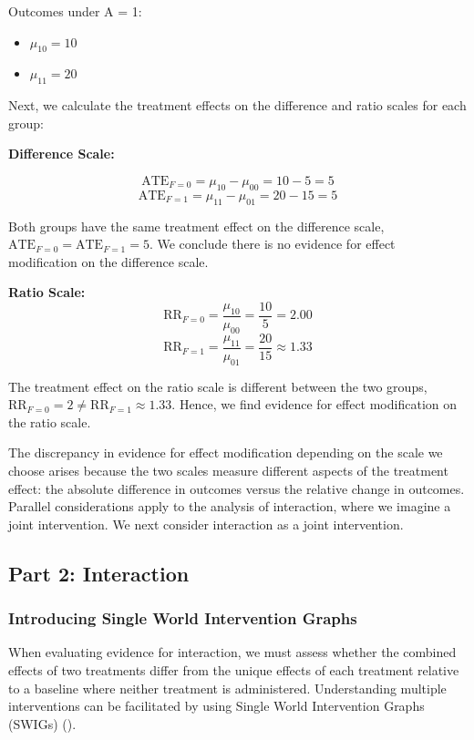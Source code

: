 \documentclass[
  single column]{article}
\providecommand{\tightlist}{%
  \setlength{\itemsep}{0pt}\setlength{\parskip}{0pt}}\usepackage{longtable,booktabs,array}
\begin{document}
Outcomes under A = 1:

\begin{itemize}
\tightlist
\item
  \(\mu_{10} = 10\)
\item
  \(\mu_{11} = 20\)
\end{itemize}

Next, we calculate the treatment effects on the difference and ratio
scales for each group:

\textbf{Difference Scale:}

\[
\text{ATE}_{F = 0} = \mu_{10} - \mu_{00} = 10 - 5 = 5
\] \[
\text{ATE}_{F = 1} = \mu_{11} - \mu_{01} = 20 - 15 = 5
\]

Both groups have the same treatment effect on the difference scale,
\(\text{ATE}_{F = 0} = \text{ATE}_{F = 1} = 5\). We conclude there is no
evidence for effect modification on the difference scale.

\textbf{Ratio Scale:} \[
\text{RR}_{F = 0} = \frac{\mu_{10}}{\mu_{00}} = \frac{10}{5} = 2.00
\] \[
\text{RR}_{F = 1} = \frac{\mu_{11}}{\mu_{01}} = \frac{20}{15} \approx 1.33
\]

The treatment effect on the ratio scale is different between the two
groups, \(\text{RR}_{F = 0} = 2 \neq \text{RR}_{F = 1} \approx 1.33\).
Hence, we find evidence for effect modification on the ratio scale.

The discrepancy in evidence for effect modification depending on the
scale we choose arises because the two scales measure different aspects
of the treatment effect: the absolute difference in outcomes versus the
relative change in outcomes. Parallel considerations apply to the
analysis of interaction, where we imagine a joint intervention. We next
consider interaction as a joint intervention.

\subsection{Part 2: Interaction}\label{id-sec-2}

\subsubsection{Introducing Single World Intervention
Graphs}\label{introducing-single-world-intervention-graphs}

When evaluating evidence for interaction, we must assess whether the
combined effects of two treatments differ from the unique effects of
each treatment relative to a baseline where neither treatment is
administered. Understanding multiple interventions can be facilitated by
using Single World Intervention Graphs (SWIGs)
().
\end{document}
